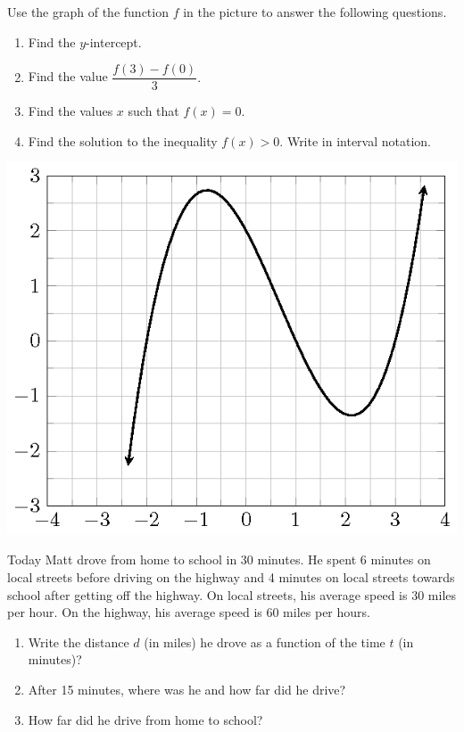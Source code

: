 \documentclass[
  en,11pt]{elegantbook}
\let\BeginKnitrBlock\begin \let\EndKnitrBlock\end
\begin{document}
\BeginKnitrBlock{exercise}
\protect\hypertarget{exr:unnamed-chunk-231}{}{\label{exr:unnamed-chunk-231} }
Use the graph of the function \(f\) in the picture to answer the following questions.

\begin{enumerate}
\def\labelenumi{\arabic{enumi}.}

\item
  Find the \(y\)-intercept.
\item
  Find the value \(\dfrac{f(3)-f(0)}{3}.\)
\item
  Find the values \(x\) such that \(f(x)=0\).
\item
  Find the solution to the inequality \(f(x)>0\). Write in interval notation.
\end{enumerate}
\EndKnitrBlock{exercise}

\begin{center}\includegraphics[width=0.5\linewidth]{figs/function-exercise-cubic} \end{center}

\BeginKnitrBlock{exercise}
\protect\hypertarget{exr:unnamed-chunk-233}{}{\label{exr:unnamed-chunk-233} }
Today Matt drove from home to school in 30 minutes. He spent 6 minutes on local streets before driving on the highway and 4 minutes on local streets towards school after getting off the highway. On local streets, his average speed is 30 miles per hour. On the highway, his average speed is 60 miles per hours.

\begin{enumerate}
\def\labelenumi{\arabic{enumi}.}

\item
  Write the distance \(d\) (in miles) he drove as a function of the time \(t\) (in minutes)?
\item
  After 15 minutes, where was he and how far did he drive?
\item
  How far did he drive from home to school?
\end{enumerate}
\EndKnitrBlock{exercise}
\end{document}
